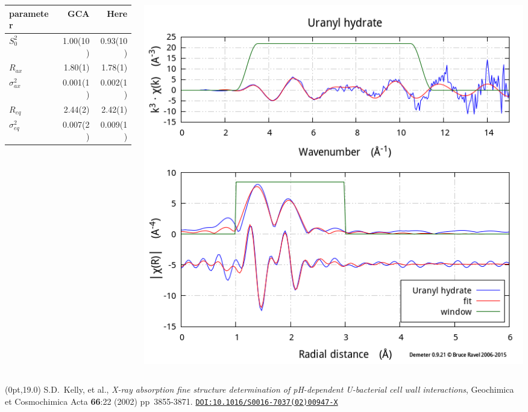 \documentclass[10pt, xcolor=x11names, compress]{beamer}
\begin{document}
\begin{frame}
\begin{columns}[T]
\begin{column}{0.5\linewidth}
      \begin{tabular}{lrr}
        \small parameter & GCA & Here \\
        \hline
        $S_0^2$         &   1.00(10) & 0.93(10) \\
        $R_{ax}$        &  1.80(1) & 1.78(1) \\
        $\sigma^2_{ax}$ &  0.001(1) & 0.002(1) \\
        $R_{eq}$        &  2.44(2) & 2.42(1) \\
        $\sigma^2_{eq}$ &  0.007(2) & 0.009(1) \\
      \end{tabular}
    \end{column}
    \begin{column}{0.5\linewidth}
      \includegraphics[width=0.85\linewidth]{images/fit.png}
    \end{column}
  \end{columns}
  \begin{textblock*}{0.7\linewidth}(0pt,19.0\TPVertModule)%
    \tiny%
    S.D.\ Kelly, et al., \textit{X-ray absorption fine structure
      determination of pH-dependent U-bacterial cell wall
      interactions}, Geochimica et Cosmochimica Acta \textbf{66}:22
    (2002) pp\  3855-3871.
    \href{http://dx.doi.org/10.1016/S0016-7037(02)00947-X}
    {\color{Blue4}\texttt{DOI:10.1016/S0016-7037(02)00947-X}}
  \end{textblock*}
\end{frame}
\end{document}

